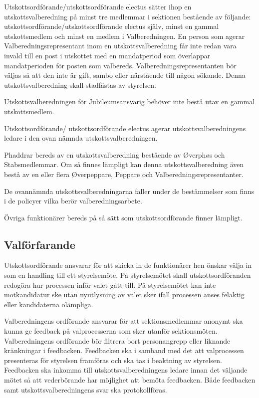 \documentclass{dsekprotokoll}
\begin{document}
Utskottsordförande/utskottsordförande electus sätter ihop en utskottsvalberedning på minst tre medlemmar i sektionen bestående av följande: utskottsordförande/utskottsordförande electus själv, minst en gammal utskottsmedlem och minst en medlem i Valberedningen. En person som agerar Valberedningsrepresentant inom en utskottsvalberedning får inte
redan vara invald till en post i utskottet med en mandatperiod som överlappar mandatperioden för posten som valbereds. Valberedningsrepresentanten bör väljas så att den inte är gift, sambo eller närstående till någon sökande. Denna utskottsvalberedning skall stadfästas av styrelsen.

Utskottsvalberedningen för Jubileumsansvarig behöver inte bestå utav en gammal utskottsmedlem.

Utskottsordförande/ utskottsordförande electus agerar utskottsvalberedningens ledare i den ovan nämnda utskottsvalberedningen.


Phaddrar bereds av en utskottsvalberedning bestående av Øverphøs och Stabsmedlemmar. Om så
finnes lämpligt kan denna utskottsvalberedning även bestå av en eller flera Øverpeppare, Peppare
och Valberedningsrepresentanter.

De ovannämnda utskottsvalberedningarna faller under de bestämmelser som finns i de policyer
vilka berör valberedningsarbete.

Övriga funktionärer bereds på så sätt som utskottsordförande finner lämpligt.

\subsection{Valförfarande}
Utskottsordförande ansvarar för att skicka in de funktionärer hen önskar välja in som en handling till ett styrelsemöte. På styrelsemötet skall utskottsordföranden redogöra hur processen inför valet gått till. På styrelsemötet kan inte motkandidatur ske utan nyutlysning av valet sker ifall processen anses felaktig eller kandidaterna olämpliga.

Valberedningens ordförande ansvarar för att sektionsmedlemmar anonymt ska kunna ge
feedback på valprocesserna som sker utanför sektionsmöten. Valberedningens ordförande bör filtrera bort personangrepp eller liknande kränkningar i feedbacken. Feedbacken ska i samband
med det att valprocessen presenteras för styrelsen framföras och ska tas i beaktning av
styrelsen. Feedbacken ska inkomma till utskottsvalberedningens ledare innan det väljande mötet
så att vederbörande har möjlighet att bemöta feedbacken. Både feedbacken samt utskottsvalberedningens svar ska protokollföras.
\end{document}
